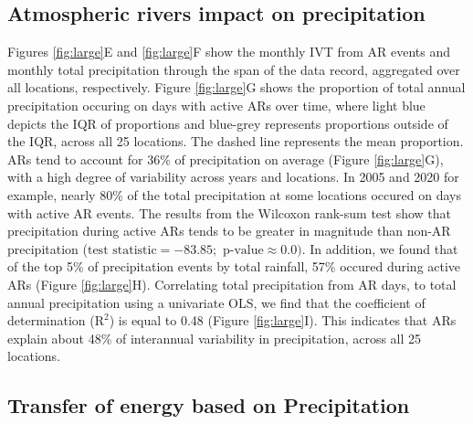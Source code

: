 \documentclass[12pts,draft]{AR_analysis_}
\begin{document}
\subsection{Atmospheric rivers impact on precipitation}

Figures \ref{fig:large}E and \ref{fig:large}F show the monthly IVT from 
AR events and monthly total precipitation through the span of the 
data record, aggregated over all locations, respectively. Figure \ref{fig:large}G
shows the proportion of total annual precipitation occuring on days with
active ARs over time, where 
light blue depicts the IQR of proportions and blue-grey represents 
proportions outside of the IQR, across all 25 locations. The dashed line 
represents the mean proportion.
ARs tend to account for 36\% of
precipitation on average (Figure \ref{fig:large}G), 
with a high degree of variability across
years and locations. In 2005 and 2020 for example, nearly 
80\% of the total precipitation at some locations occured on days with
active AR events. The results 
from the Wilcoxon rank-sum test show that
precipitation during active ARs tends to be greater in magnitude than non-AR 
precipitation
($\text{test statistic} = -83.85; \text{ p-value} \approx 0.0)$. In addition,
we found that of the top 5\% of precipitation events by total rainfall, 57\%
occured during active ARs (Figure \ref{fig:large}H).
Correlating total precipitation from AR days, to total annual
precipitation using a univariate OLS, we find that the
coefficient of determination ($\mathrm{R^{2}}$) is equal to 0.48 (Figure 
\ref{fig:large}I). This indicates that ARs
explain about 48\% of interannual variability in precipitation, 
across all 25 locations.  


\subsection{Transfer of energy based on Precipitation}
\end{document}
